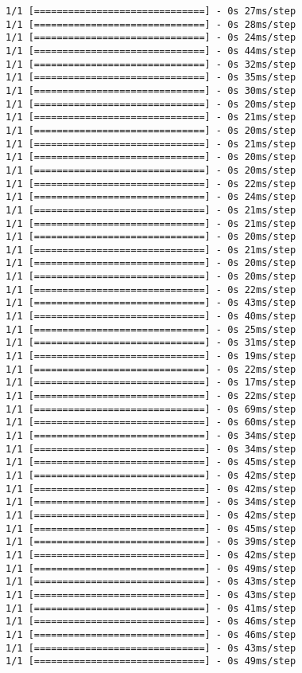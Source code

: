 \documentclass[11pt]{article}
\begin{document}
\begin{Verbatim}[commandchars=\\\{\}]
1/1 [==============================] - 0s 27ms/step
1/1 [==============================] - 0s 28ms/step
1/1 [==============================] - 0s 24ms/step
1/1 [==============================] - 0s 44ms/step
1/1 [==============================] - 0s 32ms/step
1/1 [==============================] - 0s 35ms/step
1/1 [==============================] - 0s 30ms/step
1/1 [==============================] - 0s 20ms/step
1/1 [==============================] - 0s 21ms/step
1/1 [==============================] - 0s 20ms/step
1/1 [==============================] - 0s 21ms/step
1/1 [==============================] - 0s 20ms/step
1/1 [==============================] - 0s 20ms/step
1/1 [==============================] - 0s 22ms/step
1/1 [==============================] - 0s 24ms/step
1/1 [==============================] - 0s 21ms/step
1/1 [==============================] - 0s 21ms/step
1/1 [==============================] - 0s 20ms/step
1/1 [==============================] - 0s 21ms/step
1/1 [==============================] - 0s 20ms/step
1/1 [==============================] - 0s 20ms/step
1/1 [==============================] - 0s 22ms/step
1/1 [==============================] - 0s 43ms/step
1/1 [==============================] - 0s 40ms/step
1/1 [==============================] - 0s 25ms/step
1/1 [==============================] - 0s 31ms/step
1/1 [==============================] - 0s 19ms/step
1/1 [==============================] - 0s 22ms/step
1/1 [==============================] - 0s 17ms/step
1/1 [==============================] - 0s 22ms/step
1/1 [==============================] - 0s 69ms/step
1/1 [==============================] - 0s 60ms/step
1/1 [==============================] - 0s 34ms/step
1/1 [==============================] - 0s 34ms/step
1/1 [==============================] - 0s 45ms/step
1/1 [==============================] - 0s 42ms/step
1/1 [==============================] - 0s 42ms/step
1/1 [==============================] - 0s 34ms/step
1/1 [==============================] - 0s 42ms/step
1/1 [==============================] - 0s 45ms/step
1/1 [==============================] - 0s 39ms/step
1/1 [==============================] - 0s 42ms/step
1/1 [==============================] - 0s 49ms/step
1/1 [==============================] - 0s 43ms/step
1/1 [==============================] - 0s 43ms/step
1/1 [==============================] - 0s 41ms/step
1/1 [==============================] - 0s 46ms/step
1/1 [==============================] - 0s 46ms/step
1/1 [==============================] - 0s 43ms/step
1/1 [==============================] - 0s 49ms/step

\end{Verbatim}
\end{document}
